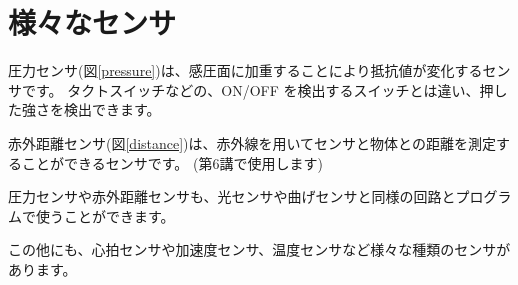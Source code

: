 \documentclass[11pt,a4paper]{jarticle}
\begin{document}
\newpage

\section{様々なセンサ}
圧力センサ(図\ref{pressure})は、感圧面に加重することにより抵抗値が変化するセンサです。
タクトスイッチなどの、ON/OFF を検出するスイッチとは違い、押した強さを検出できます。


赤外距離センサ(図\ref{distance})は、赤外線を用いてセンサと物体との距離を測定することができるセンサです。
(第6講で使用します)

圧力センサや赤外距離センサも、光センサや曲げセンサと同様の回路とプログラムで使うことができます。



この他にも、心拍センサや加速度センサ、温度センサなど様々な種類のセンサがあります。
\end{document}
